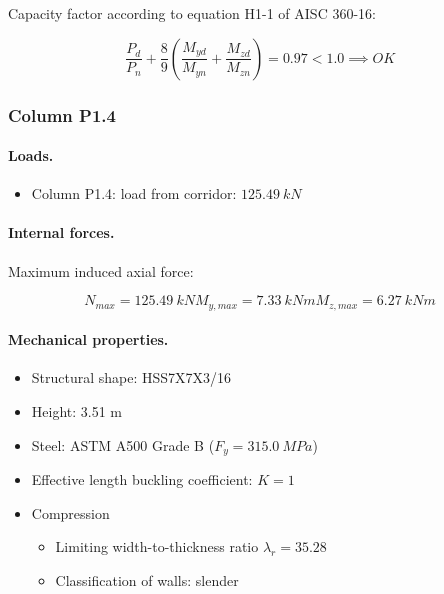 \noindent Capacity factor according to equation H1-1 of AISC 360-16:

\begin{equation}
  \frac{P_d}{P_n}+\frac{8}{9} (\frac{M_{yd}}{M_{yn}}+\frac{M_{zd}}{M_{zn}})= 0.97 < 1.0 \implies OK
  \end{equation}

\subsubsection{Column P1.4}

\paragraph{Loads.}

\begin{itemize}
\item Column P1.4: load from corridor: $125.49\ kN$
\end{itemize}

\paragraph{Internal forces.}

\noindent Maximum induced axial force:

\begin{equation}
  N_{max}= 125.49\ kN
  M_{y,max}= 7.33\ kN m
  M_{z,max}= 6.27\ kN m
\end{equation}

\paragraph{Mechanical properties.}

\begin{itemize}
\item Structural shape: HSS7X7X3/16
\item Height: 3.51 m
\item Steel: ASTM A500 Grade B ($F_y= 315.0\ MPa$)
\item Effective length buckling coefficient: $K= 1$
\item Compression
\begin{itemize}
  \item Limiting width-to-thickness ratio $\lambda_r= 35.28$
  \item Classification of walls: slender
\end{itemize}
\end{itemize}

